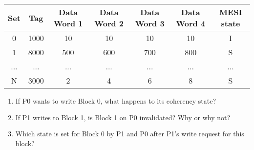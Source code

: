 \begin{center}
\begin{tabular}{|ccccccc|}
\multicolumn{1}{|c|}{\textbf{Set}} & \multicolumn{1}{c|}{\textbf{Tag}} & \multicolumn{1}{c|}{\textbf{Data Word 1}} & \multicolumn{1}{c|}{\textbf{Data Word 2}} & \multicolumn{1}{c|}{\textbf{Data Word 3}} & \multicolumn{1}{c|}{\textbf{Data Word 4}} & \textbf{MESI state} \\ \hline
\multicolumn{1}{|c|}{0}            & \multicolumn{1}{c|}{1000}         & \multicolumn{1}{c|}{10}                   & \multicolumn{1}{c|}{10}                   & \multicolumn{1}{c|}{10}                   & \multicolumn{1}{c|}{10}                   & I                   \\ \hline
\multicolumn{1}{|c|}{1}            & \multicolumn{1}{c|}{8000}         & \multicolumn{1}{c|}{500}                  & \multicolumn{1}{c|}{600}                  & \multicolumn{1}{c|}{700}                  & \multicolumn{1}{c|}{800}                  & S                   \\ \hline
\multicolumn{1}{|c|}{...}          & \multicolumn{1}{c|}{...}          & \multicolumn{1}{c|}{...}                  & \multicolumn{1}{c|}{...}                  & \multicolumn{1}{c|}{...}                  & \multicolumn{1}{c|}{...}                  & ...                 \\ \hline
\multicolumn{1}{|c|}{N}            & \multicolumn{1}{c|}{3000}         & \multicolumn{1}{c|}{2}                    & \multicolumn{1}{c|}{4}                    & \multicolumn{1}{c|}{6}                    & \multicolumn{1}{c|}{8}                    & S                   \\ \hline
\end{tabular}
\end{center}
%
\begin{enumerate}
    \item If P0 wants to write Block 0, what happens to its coherency state?
    \item If P1 writes to Block 1, is Block 1 on P0 invalidated? Why or why not?
    \item Which state is set for Block 0 by P1 and P0 after P1's write request for this block?
\end{enumerate}